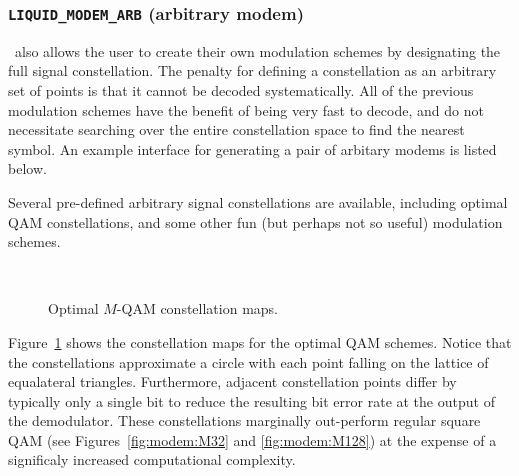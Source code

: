 \subsubsection{{\tt LIQUID\_MODEM\_ARB} (arbitrary modem)}
\label{module:modem:digital:ARB}
\liquid\ also allows the user to create their own modulation schemes by
designating the full signal constellation.
The penalty for defining a constellation as an arbitrary set of points
is that it cannot be decoded systematically.
All of the previous modulation schemes have the benefit of being very
fast to decode, and do not necessitate searching over the entire
constellation space to find the nearest symbol.
%
An example interface for generating a pair of arbitary modems is listed
below.
%

%
Several pre-defined arbitrary signal constellations are available,
including optimal QAM constellations, and some other fun
(but perhaps not so useful) modulation schemes.
%
\begin{figure}
\centering
\mbox{
   \quad
   \quad
}
\mbox{
   \quad
   \quad
}
   \quad
\caption{Optimal $M$-QAM constellation maps.}
\label{fig:modem:optqam}
\end{figure}
%
Figure~\ref{fig:modem:optqam} shows the constellation maps for the
optimal QAM schemes.
Notice that the constellations approximate a circle with each point
falling on the lattice of equalateral triangles.
Furthermore, adjacent constellation points differ by typically only a
single bit to reduce the resulting bit error rate at the output of the
demodulator.
These constellations marginally out-perform regular square QAM
(see Figures~\ref{fig:modem:M32} and \ref{fig:modem:M128})
at the expense of a significaly increased computational complexity.

